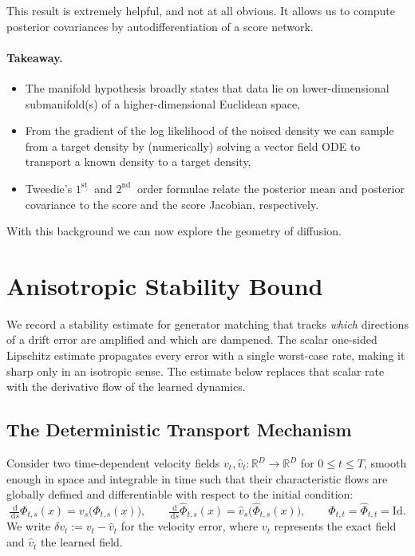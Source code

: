 \documentclass{article}
\newcommand{\R}{\mathbb{R}}
\newcommand{\Id}{\mathrm{Id}}
\newcommand{\dd}{\,\mathrm{d}}
\theoremstyle{plain}
\theoremstyle{definition}
\theoremstyle{remark}
\begin{document}
This result is extremely helpful, and not at all obvious. It allows us to compute posterior covariances by autodifferentiation of a score network. 

\paragraph{Takeaway.} 
\begin{itemize}
    \item The manifold hypothesis broadly states that data lie on lower-dimensional submanifold(s) of a higher-dimensional Euclidean space,
    \item From the gradient of the log likelihood of the noised density we can sample from a target density by (numerically) solving a vector field ODE to transport a known density to a target density,
    \item Tweedie's $1^{\text {st }}$ and $2^{\text {nd }}$ order formulae relate the posterior mean and posterior covariance to the score and the score Jacobian, respectively.
\end{itemize}

With this background we can now explore the geometry of diffusion.

\newpage

\section{Anisotropic Stability Bound}
\label{sec:aniso_stab_bound}

We record a stability estimate for generator matching that tracks \emph{which} directions of a drift error are amplified and which are dampened. The scalar one-sided Lipschitz estimate propagates every error with a single worst-case rate, making it sharp only in an isotropic sense. The estimate below replaces that scalar rate with the derivative flow of the learned dynamics.
\subsection{The Deterministic Transport Mechanism}
\label{subsec:mechanism}

Consider two time-dependent velocity fields $v_t, \hat{v}_t : \R^D \to \R^D$ for $0 \le t \le T$, smooth enough in space and integrable in time such that their characteristic flows are globally defined and differentiable with respect to the initial condition:
\begin{equation}
  \tfrac{\dd}{\dd s}\Phi_{t,s}(x) = v_s\big(\Phi_{t,s}(x)\big),
  \qquad
  \tfrac{\dd}{\dd s}\hat{\Phi}_{t,s}(x) = \hat{v}_s\big(\hat{\Phi}_{t,s}(x)\big),
  \qquad
  \Phi_{t,t} = \hat{\Phi}_{t,t} = \Id.
  \label{eq:flows}
\end{equation}
We write $\delta v_t := v_t - \hat{v}_t$ for the velocity error, where $v_t$ represents the exact field and $\hat{v}_t$ the learned field.
\end{document}
